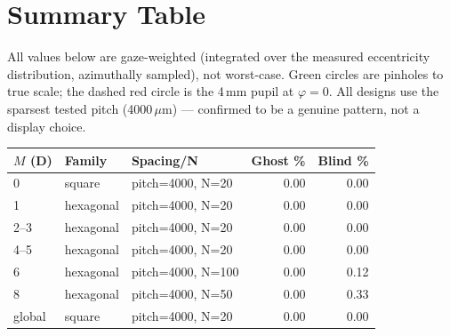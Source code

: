 \section{Summary Table}

All values below are gaze-weighted (integrated over the measured
eccentricity distribution, azimuthally sampled), not worst-case. Green
circles are pinholes to true scale; the dashed red circle is the 4\,mm
pupil at $\varphi=0$. All designs use the sparsest tested pitch
(4000\,$\mu$m) --- confirmed to be a genuine pattern, not a display choice.

\begin{center}
\begin{tabular}{lllrr}
\toprule
$M$ (D) & Family & Spacing/N & Ghost \% & Blind \% \\
\midrule
0 & square & pitch=4000, N=20 & 0.00 & 0.00 \\
1 & hexagonal & pitch=4000, N=20 & 0.00 & 0.00 \\
2--3 & hexagonal & pitch=4000, N=20 & 0.00 & 0.00 \\
4--5 & hexagonal & pitch=4000, N=20 & 0.00 & 0.00 \\
6 & hexagonal & pitch=4000, N=100 & 0.00 & 0.12 \\
8 & hexagonal & pitch=4000, N=50 & 0.00 & 0.33 \\
global & square & pitch=4000, N=20 & 0.00 & 0.00 \\
\bottomrule
\end{tabular}
\end{center}


\newpage
